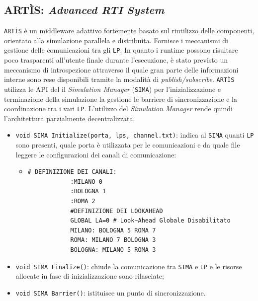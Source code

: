 \subsection{ARTÌS: \textit{Advanced RTI System}}
\texttt{ARTÌS}\cite{artis} è un middleware adattivo fortemente basato sul riutilizzo delle componenti, orientato alla simulazione parallela e distribuita. Fornisce i meccanismi di gestione delle comunicazioni tra gli \texttt{LP}.\newline
In quanto i runtime possono risultare poco trasparenti all'utente finale durante l'esecuzione, è stato previsto un meccanismo di introspezione attraverso il quale gran parte delle informazioni interne sono rese disponibili tramite la modalità di \textit{publish/subscribe}.\newline
\texttt{ARTÌS} utilizza le API del il \textit{Simulation Manager} (\texttt{SIMA}) per l'inizializzazione e terminazione della simulazione la gestione le barriere di sincronizzazione e la coordinazione tra i vari \texttt{LP}. L'utilizzo del \textit{Simulation Manager} rende quindi l'architettura parzialmente decentralizzata.
\begin{itemize}
    \item \texttt{void SIMA Initialize(porta, lps, channel.txt)}: indica al \texttt{SIMA} quanti \texttt{LP} sono presenti, quale porta è utilizzata per le comunicazioni e da quale file leggere le configurazioni dei canali di comunicazione:
        \begin{itemize}
            \item[] \begin{lstlisting}[caption={Esempio di configurazione}]
            # DEFINIZIONE DEI CANALI:
            :MILANO 0
            :BOLOGNA 1
            :ROMA 2
            #DEFINIZIONE DEI LOOKAHEAD
            GLOBAL LA=0 # Look−Ahead Globale Disabilitato
            MILANO: BOLOGNA 5 ROMA 7
            ROMA: MILANO 7 BOLOGNA 3
            BOLOGNA: MILANO 5 ROMA 3
            \end{lstlisting}
        \end{itemize}
    \item \texttt{void SIMA Finalize()}: chiude la comunicazione tra \texttt{SIMA} e \texttt{LP} e le risorse allocate in fase di inizializzazione sono rilasciate;
    \item \texttt{void SIMA Barrier()}: istituisce un punto di sincronizzazione.
\end{itemize}

